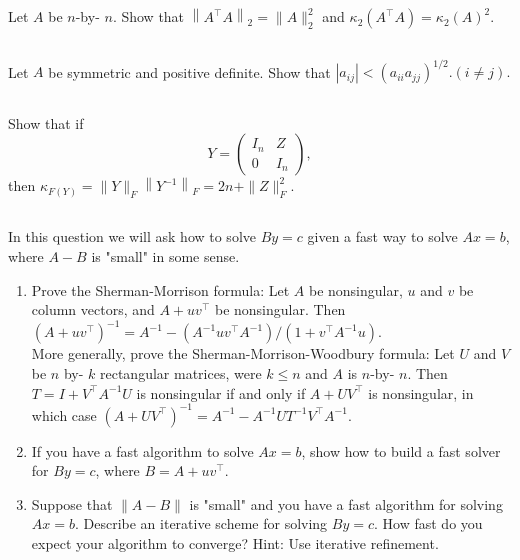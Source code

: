 \documentclass[a4paper]{ctexart}
\newcommand{\pf}{\textbf{\color{pink}{proof:}}}
\begin{document}
\pf

\subsection{}
Let $A$ be $n$-by- $n$. Show that $\left\|A^{\top} A\right\|_2=\|A\|_2^2$ and $\kappa_2\left(A^{\top} A\right)=\kappa_2(A)^2$.

\pf

\subsection{}
Let $A$ be symmetric and positive definite. Show that $\left|a_{ij}\right|<\left(a_{i i} a_{j j}\right)^{1/2} .(i \neq j).$

\pf

\subsection{}
Show that if
\[Y = \begin{pmatrix}
I_n & Z \\
0& I_n
\end{pmatrix},\]
then $\kappa_{F(Y)}=\|Y\|_F\left\|Y^{-1}\right\|_F=2n+\|Z\|_F^2$.

\pf

\subsection{}
In this question we will ask how to solve $B y=c$ given a fast way to solve $A x=b$, where $A-B$ is "small" in some sense.
\begin{enumerate}
    \item Prove the Sherman-Morrison formula: Let $A$ be nonsingular, $u$ and $v$ be column 
    vectors, and $A+u v^{\top}$ be nonsingular. Then
    $ \left(A+u v^{\top}\right)^{-1}=A^{-1}-\left(A^{-1} u v^{\top} A^{-1}\right) /\left(1+v^{\top} A^{-1} u\right) .$ \\

    More generally, prove the Sherman-Morrison-Woodbury formula: Let $U$ and $V$ be $n$ by- $k$ rectangular matrices, were $k \leq n$ and $A$ is $n$-by- $n$. Then $T=I+V^{\top} A^{-1} U$ 
    is nonsingular if and only if $A+U V^{\top}$ is nonsingular, in which case
    $\left(A+U V^{\top}\right)^{-1}=A^{-1}-A^{-1} U T^{-1} V^{\top} A^{-1} .$
    \item If you have a fast algorithm to solve $A x=b$, show how to build a fast solver for $B y=c$, where $B=A+u v^{\top}$.
    \item Suppose that $\|A-B\|$ is "small" and you have a fast algorithm for solving $A x=b$. Describe an iterative scheme for solving $B y=c$. How fast do you expect your algorithm to converge? Hint: Use iterative refinement.
\end{enumerate}
\end{document}
